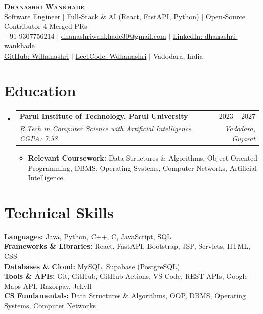 \documentclass[letterpaper,11pt]{article}
\makeatletter
\newcommand{\resumeItem}[1]{
  \item\small{
        {#1 \vspace{-1pt}}
  }
}
\newcommand{\resumeSubheading}[4]{
  \vspace{-2pt}\item
        \begin{tabular*}{0.97\textwidth}[t]{l@{\extracolsep{\fill}}r}
        \textbf{#1} & #2 \\
        \textit{\small#3} & \textit{\small #4} \\
                \end{tabular*}\vspace{-6pt}
}
\newcommand{\resumeSubHeadingListStart}{\begin{itemize}[leftmargin=0.15in, label={}, itemsep=2pt, parsep=0pt]}
\newcommand{\resumeSubHeadingListEnd}{\end{itemize}}
\newcommand{\resumeItemListStart}{\begin{itemize}[leftmargin=0.18in, itemsep=2pt, parsep=0pt]}
\newcommand{\resumeItemListEnd}{\end{itemize}\vspace{-4pt}}
\makeatother
\begin{document}
\begin{center}
        \textbf{\Huge \scshape Dhanashri Wankhade} \\ \vspace{2pt}
        {\small Software Engineer $|$ Full-Stack \& AI (React, FastAPI, Python) $|$ Open-Source Contributor \textemdash{} 4 Merged PRs} \\ \vspace{2pt}
        \small +91 9307756214 $|$ \href{mailto:dhanashriwankhade30@gmail.com}{dhanashriwankhade30@gmail.com} $|$
        \href{https://linkedin.com/in/dhanashri-wankhade-7b8377345}{LinkedIn: dhanashri-wankhade} \\ \vspace{1pt}
        \href{https://github.com/Wdhanashri}{GitHub: Wdhanashri} $|$
        \href{https://leetcode.com/u/Wdhanashri/}{LeetCode: Wdhanashri} $|$ Vadodara, India
\end{center}

\section{Education}
  \resumeSubHeadingListStart
    \resumeSubheading
      {Parul Institute of Technology, Parul University}{2023 -- 2027}
      {B.Tech in Computer Science with Artificial Intelligence \textemdash{} CGPA: 7.58}{Vadodara, Gujarat}
      \resumeItemListStart
        \resumeItem{\textbf{Relevant Coursework:} Data Structures \& Algorithms, Object-Oriented Programming, DBMS, Operating Systems, Computer Networks, Artificial Intelligence}
      \resumeItemListEnd
  \resumeSubHeadingListEnd

\section{Technical Skills}
 \begin{itemize}[leftmargin=0.15in, label={}, itemsep=2pt, parsep=0pt]
    \small{\item{
      \textbf{Languages:} Java, Python, C++, C, JavaScript, SQL \\
      \textbf{Frameworks \& Libraries:} React, FastAPI, Bootstrap, JSP, Servlets, HTML, CSS \\
      \textbf{Databases \& Cloud:} MySQL, Supabase (PostgreSQL) \\
      \textbf{Tools \& APIs:} Git, GitHub, GitHub Actions, VS Code, REST APIs, Google Maps API, Razorpay, Jekyll \\
      \textbf{CS Fundamentals:} Data Structures \& Algorithms, OOP, DBMS, Operating Systems, Computer Networks
    }}
 \end{itemize}
\end{document}
